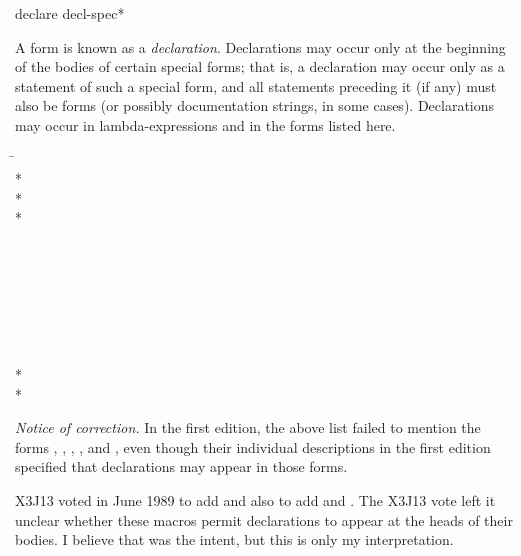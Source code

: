 \begin{defspec}
declare {decl-spec}*

A  form is known as a {\it declaration}.
Declarations may occur only at the beginning of the bodies of
certain special forms;
that is, a declaration may occur only as a statement
of such a special form, and all statements preceding it (if any) must
also be  forms (or possibly documentation strings, in some cases).
Declarations may occur in lambda-expressions and in the forms listed here.
\begin{lisp}
\hskip 12pc\=\kill
{}\> \\*
\> \\*
\> \\*
\> \\
\> \\
\> \\
\> \\
\> \\
\> \\
\> \\
\> \\*
\> \\*
\end{lisp}
\begin{new}%
{\it Notice of correction.}
In the first edition, the above list failed to mention the forms
, , ,
, and , even though
their individual descriptions in the first edition specified that declarations
may appear in those forms.
\end{new}

X3J13 voted in June 1989  to add 
and also  to add 
and .
The X3J13 vote left it unclear whether these macros
permit declarations to appear at the heads of their bodies.
I believe that was the intent,
but this is only my interpretation.


\end{defspec}
